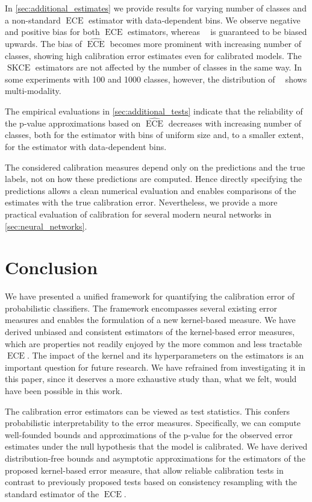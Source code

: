 \documentclass{article}
\DeclareMathOperator{\ECE}{ECE}
\DeclareMathOperator{\squaredkernelmeasure}{SKCE}
\DeclareMathOperator{\biasedestimator}{\widehat{SKCE}_b}
\DeclareMathOperator{\linearestimator}{\widehat{SKCE}_{ul}}
\begin{document}
In \cref{sec:additional_estimates} we provide results for varying
number of classes and a non-standard $\ECE$ estimator with data-dependent bins.
We observe negative and positive bias for both $\ECE$ estimators, whereas
$\biasedestimator$ is guaranteed to be biased upwards. The bias of $\widehat{\ECE}$
becomes more prominent with increasing number of classes, showing high calibration
error estimates even for calibrated models. The $\squaredkernelmeasure$
estimators are not affected by the number of classes in the same way. In some
experiments with 100 and 1000 classes, however, the distribution of
$\linearestimator$ shows multi-modality.

The empirical evaluations in \cref{sec:additional_tests} indicate
that the reliability of the p-value approximations based on $\widehat{\ECE}$
decreases with increasing number of classes, both for the estimator with bins
of uniform size and, to a smaller extent, for the estimator with data-dependent bins.

The considered calibration measures depend only on the predictions and the
true labels, not on how these predictions are computed. Hence directly
specifying the predictions allows a clean numerical evaluation and enables
comparisons of the estimates with the true calibration error. Nevertheless, we
provide a more practical evaluation of calibration for several modern neural
networks in \cref{sec:neural_networks}.

\section{Conclusion}

We have presented a unified framework for quantifying the calibration error of
probabilistic classifiers. The framework encompasses several existing error
measures and enables the formulation of a new kernel-based measure. We have
derived unbiased and consistent estimators of the kernel-based error measures,
which are properties not readily enjoyed by the more common and less tractable
$\ECE$. The impact of the kernel and its hyperparameters on the estimators is an
important question for future research. We have refrained from investigating it
in this paper, since it deserves a more exhaustive study than, what we felt,
would have been possible in this work.

The calibration error estimators can be viewed as test statistics. This confers
probabilistic interpretability to the error measures. Specifically, we can
compute well-founded bounds and approximations of the p-value for the observed
error estimates under the null hypothesis that the model is calibrated. We
have derived distribution-free bounds and asymptotic approximations for the
estimators of the proposed kernel-based error measure, that allow reliable
calibration tests in contrast to previously proposed tests based on consistency
resampling with the standard estimator of the $\ECE$.
\end{document}
